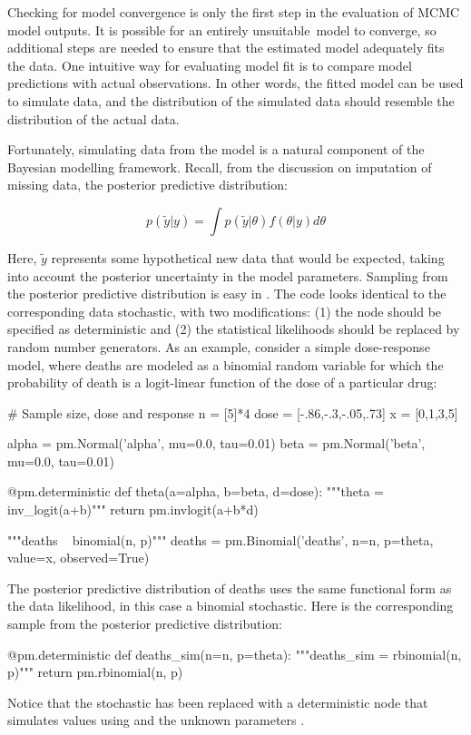 \documentclass[]{jss}
\begin{document}
Checking for model convergence is only the first step in the evaluation of MCMC model outputs. It is possible for an entirely unsuitable~model to converge, so additional steps are needed to ensure that the estimated model adequately fits the data. One intuitive way for evaluating model fit is to compare model predictions with actual observations. In other words, the fitted model can be used to simulate data, and the distribution of the simulated data should resemble the distribution of the actual data.

Fortunately, simulating data from the model is a natural component of the Bayesian modelling framework. Recall, from the discussion on imputation of missing data, the posterior predictive distribution:

\begin{equation}
  p(\tilde{y}|y) = \int p(\tilde{y}|\theta) f(\theta|y) d\theta
\end{equation}

Here, $\tilde{y}$ represents some hypothetical new data that would be expected, taking into account the posterior uncertainty in the model parameters. Sampling from the posterior predictive distribution is easy in . The code looks identical to the corresponding data stochastic, with two modifications: (1) the node should be specified as deterministic and (2) the statistical likelihoods should be replaced by random number generators. As an example, consider a simple dose-response model, where deaths are modeled as a binomial random variable for which the probability of death is a logit-linear function of the dose of a particular drug:
\begin{CodeInput}
# Sample size, dose and response
n = [5]*4
dose = [-.86,-.3,-.05,.73]
x = [0,1,3,5]

alpha = pm.Normal('alpha', mu=0.0, tau=0.01)
beta = pm.Normal('beta', mu=0.0, tau=0.01)

@pm.deterministic
def theta(a=alpha, b=beta, d=dose):
    """theta = inv_logit(a+b)"""
    return pm.invlogit(a+b*d)

"""deaths ~ binomial(n, p)"""
deaths = pm.Binomial('deaths', n=n, p=theta, value=x, observed=True)
\end{CodeInput}
The posterior predictive distribution of deaths uses the same functional form as the data likelihood, in this case a binomial stochastic. Here is the corresponding sample from the posterior predictive distribution:
\begin{CodeInput}
@pm.deterministic
def deaths_sim(n=n, p=theta):
    """deaths_sim = rbinomial(n, p)"""
    return pm.rbinomial(n, p)
\end{CodeInput}
Notice that the stochastic  has been replaced with a deterministic node that simulates values using  and the unknown parameters . 
\end{document}
